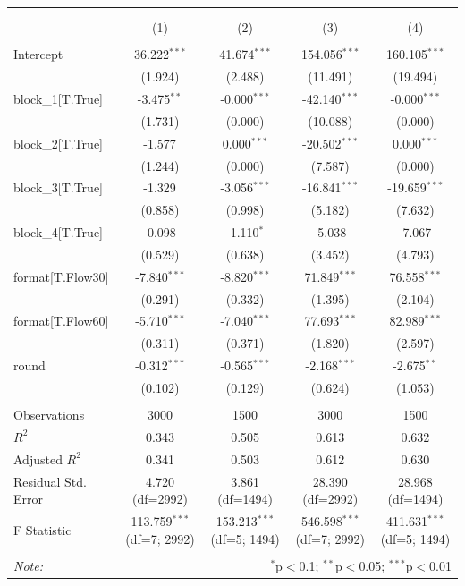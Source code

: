 \begin{table}[!htbp] \centering
\begin{tabular}{@{\extracolsep{5pt}}lcccc}
\\[-1.8ex]\hline
\hline \\[-1.8ex]
\\[-1.8ex] & (1) & (2) & (3) & (4) \\
\hline \\[-1.8ex]
 Intercept & 36.222$^{***}$ & 41.674$^{***}$ & 154.056$^{***}$ & 160.105$^{***}$ \\
& (1.924) & (2.488) & (11.491) & (19.494) \\
 block_1[T.True] & -3.475$^{**}$ & -0.000$^{***}$ & -42.140$^{***}$ & -0.000$^{***}$ \\
& (1.731) & (0.000) & (10.088) & (0.000) \\
 block_2[T.True] & -1.577$^{}$ & 0.000$^{***}$ & -20.502$^{***}$ & 0.000$^{***}$ \\
& (1.244) & (0.000) & (7.587) & (0.000) \\
 block_3[T.True] & -1.329$^{}$ & -3.056$^{***}$ & -16.841$^{***}$ & -19.659$^{***}$ \\
& (0.858) & (0.998) & (5.182) & (7.632) \\
 block_4[T.True] & -0.098$^{}$ & -1.110$^{*}$ & -5.038$^{}$ & -7.067$^{}$ \\
& (0.529) & (0.638) & (3.452) & (4.793) \\
 format[T.Flow30] & -7.840$^{***}$ & -8.820$^{***}$ & 71.849$^{***}$ & 76.558$^{***}$ \\
& (0.291) & (0.332) & (1.395) & (2.104) \\
 format[T.Flow60] & -5.710$^{***}$ & -7.040$^{***}$ & 77.693$^{***}$ & 82.989$^{***}$ \\
& (0.311) & (0.371) & (1.820) & (2.597) \\
 round & -0.312$^{***}$ & -0.565$^{***}$ & -2.168$^{***}$ & -2.675$^{**}$ \\
& (0.102) & (0.129) & (0.624) & (1.053) \\
\hline \\[-1.8ex]
 Observations & 3000 & 1500 & 3000 & 1500 \\
 $R^2$ & 0.343 & 0.505 & 0.613 & 0.632 \\
 Adjusted $R^2$ & 0.341 & 0.503 & 0.612 & 0.630 \\
 Residual Std. Error & 4.720 (df=2992) & 3.861 (df=1494) & 28.390 (df=2992) & 28.968 (df=1494) \\
 F Statistic & 113.759$^{***}$ (df=7; 2992) & 153.213$^{***}$ (df=5; 1494) & 546.598$^{***}$ (df=7; 2992) & 411.631$^{***}$ (df=5; 1494) \\
\hline
\hline \\[-1.8ex]
\textit{Note:} & \multicolumn{4}{r}{$^{*}$p$<$0.1; $^{**}$p$<$0.05; $^{***}$p$<$0.01} \\
\end{tabular}
\end{table}